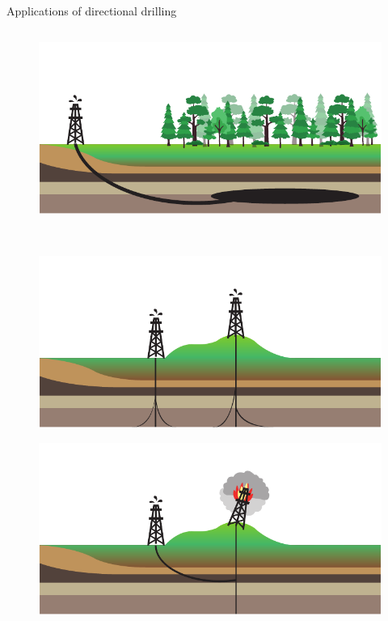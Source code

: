 \documentclass[10pt]{beamer}
\begin{document}
\begin{frame}{Applications of directional drilling}	
	\begin{columns}
	\hspace{0.9cm}\begin{column}{0.4\textwidth}
	\begin{figure}[t]
		\centering
		\begin{minipage}[t]{1\textwidth}
			\centering
			\includegraphics[width=1\linewidth]{images/appdd1.pdf}\\
		\end{minipage}%
		\\\begin{minipage}[t]{1\textwidth}
			\centering
			\includegraphics[width=1\linewidth]{images/appdd2.pdf}\\
		\end{minipage}
		\begin{minipage}[t]{1\textwidth}
			\centering
			\includegraphics[width=1\linewidth]{images/appdd3.pdf}\\

\end{minipage}
\end{figure}
\end{column}
\end{columns}
\end{frame}
\end{document}
